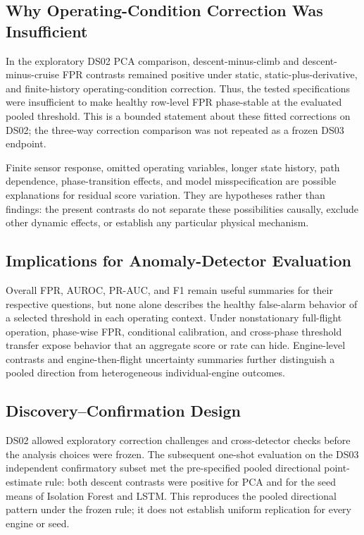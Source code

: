 \documentclass[10pt,conference]{IEEEtran}
\begin{document}
\subsection{Why Operating-Condition Correction Was Insufficient}\label{why-operating-condition-correction-was-insufficient}

In the exploratory DS02 PCA comparison, descent-minus-climb and descent-minus-cruise FPR contrasts remained positive under static, static-plus-derivative, and finite-history operating-condition correction. Thus, the tested specifications were insufficient to make healthy row-level FPR phase-stable at the evaluated pooled threshold. This is a bounded statement about these fitted corrections on DS02; the three-way correction comparison was not repeated as a frozen DS03 endpoint.

Finite sensor response, omitted operating variables, longer state history, path dependence, phase-transition effects, and model misspecification are possible explanations for residual score variation. They are hypotheses rather than findings: the present contrasts do not separate these possibilities causally, exclude other dynamic effects, or establish any particular physical mechanism.

\subsection{Implications for Anomaly-Detector Evaluation}\label{implications-for-anomaly-detector-evaluation}

Overall FPR, AUROC, PR-AUC, and F1 remain useful summaries for their respective questions, but none alone describes the healthy false-alarm behavior of a selected threshold in each operating context. Under nonstationary full-flight operation, phase-wise FPR, conditional calibration, and cross-phase threshold transfer expose behavior that an aggregate score or rate can hide. Engine-level contrasts and engine-then-flight uncertainty summaries further distinguish a pooled direction from heterogeneous individual-engine outcomes.

\subsection{Discovery--Confirmation Design}\label{discoveryconfirmation-design}

DS02 allowed exploratory correction challenges and cross-detector checks before the analysis choices were frozen. The subsequent one-shot evaluation on the DS03 independent confirmatory subset met the pre-specified pooled directional point-estimate rule: both descent contrasts were positive for PCA and for the seed means of Isolation Forest and LSTM. This reproduces the pooled directional pattern under the frozen rule; it does not establish uniform replication for every engine or seed.
\end{document}
